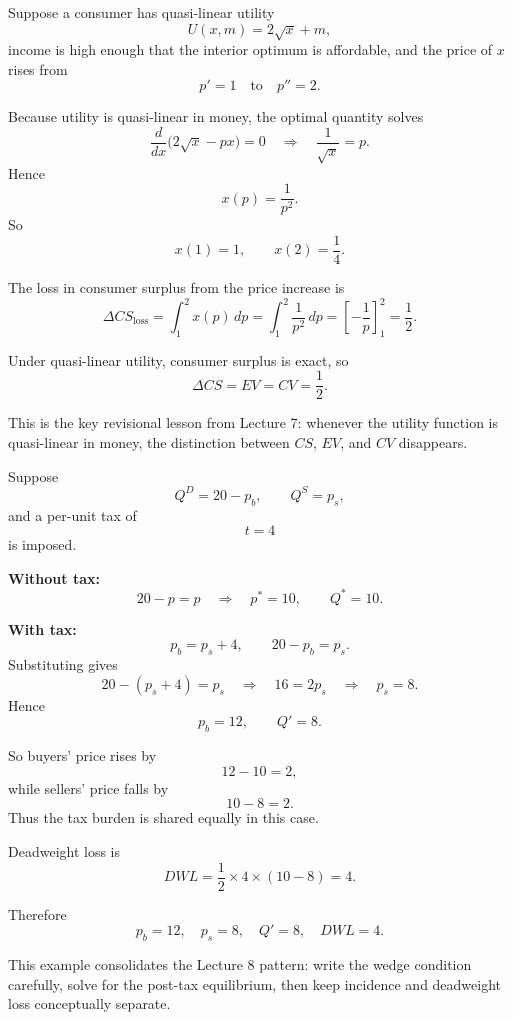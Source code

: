 \begin{examplebox}[title={Worked Review Example 1: When is consumer surplus exact?}]
Suppose a consumer has quasi-linear utility
\[
U(x,m)=2\sqrt{x}+m,
\]
income is high enough that the interior optimum is affordable, and the price of \(x\) rises from
\[
p'=1 \quad \text{to} \quad p''=2.
\]

Because utility is quasi-linear in money, the optimal quantity solves
\[
\frac{d}{dx}\bigl(2\sqrt{x}-px\bigr)=0
\quad \Longrightarrow \quad
\frac{1}{\sqrt{x}}=p.
\]
Hence
\[
x(p)=\frac{1}{p^2}.
\]
So
\[
x(1)=1,
\qquad
x(2)=\frac14.
\]

The loss in consumer surplus from the price increase is
\[
\Delta CS_{\text{loss}}
=
\int_{1}^{2} x(p)\,dp
=
\int_1^2 \frac{1}{p^2}\,dp
=
\left[-\frac{1}{p}\right]_1^2
=
\frac12.
\]

Under quasi-linear utility, consumer surplus is exact, so
\[
\boxed{\Delta CS=EV=CV=\frac12.}
\]

This is the key revisional lesson from Lecture 7: whenever the utility function is quasi-linear in money, the distinction between \(CS\), \(EV\), and \(CV\) disappears.
\end{examplebox}

\begin{examplebox}[title={Worked Review Example 2: Linear tax incidence and deadweight loss}]
Suppose
\[
Q^D=20-p_b,
\qquad
Q^S=p_s,
\]
and a per-unit tax of
\[
t=4
\]
is imposed.

\textbf{Without tax:}
\[
20-p=p
\quad \Longrightarrow \quad
p^*=10,
\qquad
Q^*=10.
\]

\textbf{With tax:}
\[
p_b=p_s+4,
\qquad
20-p_b=p_s.
\]
Substituting gives
\[
20-(p_s+4)=p_s
\quad \Longrightarrow \quad
16=2p_s
\quad \Longrightarrow \quad
p_s=8.
\]
Hence
\[
p_b=12,
\qquad
Q'=8.
\]

So buyers' price rises by
\[
12-10=2,
\]
while sellers' price falls by
\[
10-8=2.
\]
Thus the tax burden is shared equally in this case.

Deadweight loss is
\[
DWL=\frac12 \times 4 \times (10-8)=4.
\]

Therefore
\[
\boxed{p_b=12,\quad p_s=8,\quad Q'=8,\quad DWL=4.}
\]

This example consolidates the Lecture 8 pattern: write the wedge condition carefully, solve for the post-tax equilibrium, then keep incidence and deadweight loss conceptually separate.
\end{examplebox}

